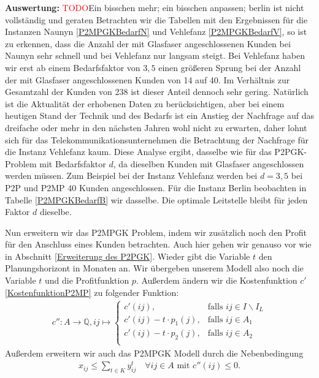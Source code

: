 \documentclass[11pt,a4paper]{article}
\newcommand{\Q}{\mathbb{Q}}
\newcommand{\TODO}{\textcolor{red}{TODO}}
\theoremstyle{my_th_style1}
\begin{document}
 \textbf{Auswertung:} \TODO Ein bisschen mehr; ein bisschen anpassen; berlin ist nicht vollständig und geraten
 Betrachten wir die Tabellen mit den Ergebnissen f\"ur die Instanzen Naunyn \eqref{P2MPGKBedarfN} und Vehlefanz \eqref{P2MPGKBedarfV}, so ist zu erkennen, dass die Anzahl der mit Glasfaser angeschlossenen Kunden bei Naunyn sehr schnell und bei Vehlefanz nur langsam steigt.
Bei Vehlefanz haben wir erst ab einem Bedarfsfaktor von \(3,5\) einen gr\"oßeren Sprung bei der Anzahl der mit Glasfaser angeschlossenen Kunden von 14 auf 40.
Im Verh\"altnis zur Gesamtzahl der Kunden von 238 ist dieser Anteil dennoch sehr gering. 
Nat\"urlich ist die Aktualit\"at der erhobenen Daten zu ber\"ucksichtigen, aber bei einem heutigen Stand der Technik und des Bedarfs ist ein Anstieg der Nachfrage auf das dreifache oder mehr in den n\"achsten Jahren wohl nicht zu erwarten, daher lohnt sich f\"ur das Telekommunikationsunternehmen die Betrachtung der Nachfrage f\"ur die Instanz Vehlefanz kaum. 
Diese Analyse ergibt, dasselbe wie für das P2PGK- Problem mit Bedarfsfaktor $d$, da dieselben Kunden mit Glasfaser angeschlossen werden müssen. Zum Beispiel bei der Instanz Vehlefanz werden bei $d=3,5$ bei P2P und P2MP 40 Kunden angeschlossen. Für die Instanz Berlin beobachten in Tabelle \eqref{P2MPGKBedarfB} wir dasselbe.
Die optimale Leitstelle bleibt für jeden Faktor $d$ dieselbe. 
  
Nun erweitern wir das P2MPGK Problem, indem wir zusätzlich noch den Profit für den Anschluss eines Kunden betrachten.
Auch hier gehen wir genauso vor wie in Abschnitt \ref{Erweiterung des P2PGK}.
Wieder gibt die Variable $t$ den Planungshorizont in Monaten an.
Wir \"ubergeben unserem Modell also noch die Variable $t$ und die Profitfunktion $p$.
Außerdem \"andern wir die Kostenfunktion \(c'\) \eqref{KostenfunktionP2MP}  zu folgender Funktion:
\begin{align*}
  c'': A  \rightarrow \Q,  ij  \mapsto \left\{\begin{array}{cl} 
 c'(ij), & \text{falls } ij \in I\backslash I_L \\ 
  c'(ij) -t  \cdot p_1(j), & \text{falls } ij \in A_1 \\ 
    c'(ij) -t \cdot p_2(j), & \text{falls } ij \in  A_2 \\ 
\end{array}  \right.
\end{align*}
Außerdem erweitern wir auch das P2MPGK Modell durch die Nebenbedingung 
\begin{align*}
 x_{ij} \leq \displaystyle\sum_{t \in K} y_{ij}^t \quad \forall ij \in A \text{ mit } c''(ij) \leq 0.
\end{align*}
\end{document}
